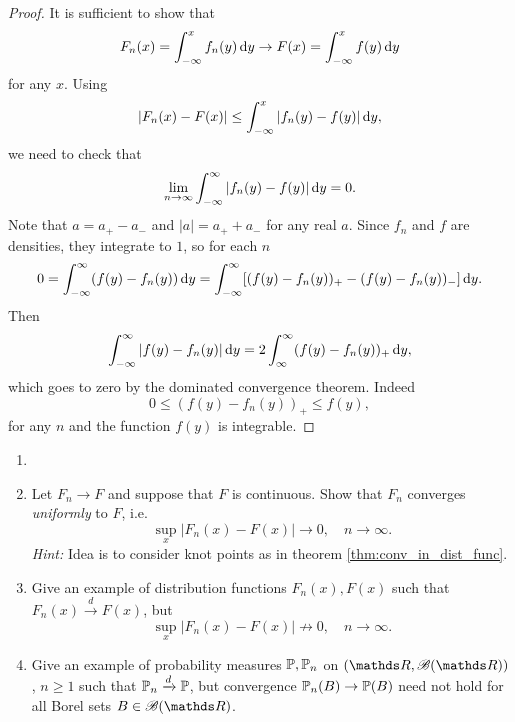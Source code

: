 \begin{proof}
It is sufficient to show that 
\begin{equation*}
    F_n(x) = \int_{-\infty}^x f_n(y) \, \mathrm{d} y \to F(x) = \int_{-\infty}^x f(y) \, \mathrm{d} y
\end{equation*}
for any $x$. Using 
\begin{equation*}
    |F_n(x) - F(x)| \le \int_{-\infty}^x |f_n(y) - f(y)| \, \mathrm{d} y,
\end{equation*}
we need to check that
\begin{equation*}
    \lim_{n \to \infty} \int_{-\infty}^\infty |f_n(y) - f(y)| \, \mathrm{d} y = 0.
\end{equation*}
Note that $a = a_+ - a_-$ and $|a| = a_+ + a_-$ for any real $a$. Since $f_n$ and $f$ are densities, they integrate to $1$, so for each $n$
\begin{equation*}
    0 = \int_{-\infty}^\infty (f(y) - f_n(y)) \, \mathrm{d} y = \int_{-\infty}^\infty [(f(y) - f_n(y))_+ - (f(y) - f_n(y))_-] \, \mathrm{d} y.
\end{equation*}
Then
\begin{equation*}
    \int_{-\infty}^\infty |f(y) - f_n(y)| \, \mathrm{d} y = 2\int_{\infty}^\infty(f(y) - f_n(y))_+ \, \mathrm{d} y,
\end{equation*}
which goes to zero by the dominated convergence theorem. Indeed 
\begin{equation*}
    0 \le (f(y) - f_n(y))_+ \le f(y),
\end{equation*}
for any $n$ and the function $f(y)$ is integrable.
\end{proof}

\begin{exercise}
\begin{enumerate}
    \item[]
    \item Let $F_n \to F$ and suppose that $F$ is continuous. Show that $F_n$ converges \textit{uniformly} to $F$, i.e.
    \begin{equation*}
        \sup_x |F_n(x) - F(x)| \to 0, \quad n \to \infty.
    \end{equation*}
    \textit{Hint:} Idea is to consider knot points as in theorem \ref{thm:conv_in_dist_func}.
    \item Give an example of distribution functions $F_n(x), F(x)$ such that $F_n(x) \xrightarrow{d} F(x)$, but 
    \begin{equation*}
        \sup_x |F_n(x) - F(x)| \not \to 0, \quad n \to \infty.
    \end{equation*}
    \item Give an example of probability measures $\mathbb{P}, \mathbb{P}_n$ on $(\R, \B(\R))$, $n \ge 1$ such that $\mathbb{P}_n \xrightarrow{d} \mathbb{P}$, but convergence $\mathbb{P}_n(B) \to \mathbb{P}(B)$ need not hold for all Borel sets $B \in \B(\R)$.
\end{enumerate}
\end{exercise}

